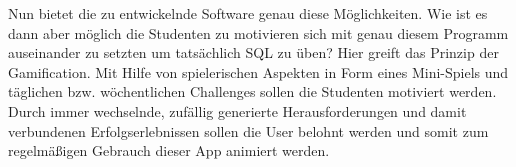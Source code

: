 Nun bietet die zu entwickelnde Software genau diese M\"oglichkeiten. Wie ist es dann aber m\"oglich die Studenten zu motivieren sich mit genau diesem Programm auseinander zu setzten um tats\"achlich SQL zu \"uben? Hier greift das Prinzip der \glqq Gamification\grqq. Mit Hilfe von spielerischen Aspekten in Form eines Mini-Spiels und t\"aglichen bzw. w\"ochentlichen Challenges sollen die Studenten motiviert werden. Durch immer wechselnde, zuf\"allig generierte Herausforderungen und damit verbundenen Erfolgserlebnissen sollen die User belohnt werden und somit zum regelm\"a{\ss}igen Gebrauch dieser App animiert werden.

